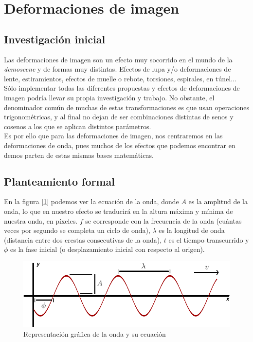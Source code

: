 \section{Deformaciones de imagen} \label{sec:deformaciones}

\subsection{Investigación inicial}

Las deformaciones de imagen son un efecto muy socorrido en el mundo de la \emph{demoscene} y de formas muy distintas. Efectos de lupa y/o deformaciones de lente, estiramientos, efectos de muelle o rebote, torsiones, espirales, en túnel...\\

Sólo implementar todas las diferentes propuestas y efectos de deformaciones de imagen podría llevar su propia investigación y trabajo. No obstante, el denominador común de muchas de estas transformaciones es que usan operaciones trigonométricas, y al final no dejan de ser combinaciones  distintas de senos y cosenos a los que se aplican distintos parámetros.\\

Es por ello que para las deformaciones de imagen, nos centraremos en las deformaciones de onda, pues muchos de los efectos que podemos encontrar en demos parten de estas mismas bases matemáticas.\\

\subsection{Planteamiento formal}

En la figura [\ref{fig:wavefunction}] podemos ver la ecuación de la onda, donde \(A\) es la amplitud de la onda, lo que en nuestro efecto se traducirá en la altura máxima y mínima de nuestra onda, en píxeles. \(f\) se corresponde con la frecuencia de la onda (cuántas veces por segundo se completa un ciclo de onda), \(\lambda\) es la longitud de onda (distancia entre dos crestas consecutivas de la onda), \(t\) es el tiempo transcurrido y \(\phi\) es la fase inicial (o desplazamiento inicial con respecto al origen).\\

\begin{figure}[h]
	\centering
	\includegraphics[width=13cm]{archivos/wave}
	\caption{Representación gráfica de la onda y su ecuación}
	\label{fig:wavefunction}
\end{figure}


